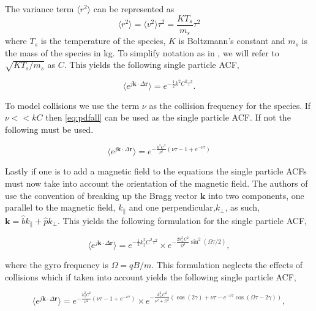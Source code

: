 \noindent The variance term $\langle r^2 \rangle$ can be represented as
\begin{equation}
\label{eq:var}
\langle r^2 \rangle = \langle v^2 \rangle \tau^2 = \frac{KT_s}{m_s} \tau^2
\end{equation}
 \noindent where $T_s$ is the temperature of the species, $K$ is Boltzmann's constant and $m_s$ is the mass of the species in kg. To simplify notation as in \citet{kudeki:milla:1}, we will refer to $\sqrt{KT_s/m_s}$ as $C$. This yields the following single particle ACF,
 
 \begin{equation}
\label{eq:pdfall}
\langle e^{j\mathbf{k}\cdot\Delta \mathbf{r}}\rangle= e^{-\frac{1}{2}k^2C^2 \tau^2}.
\end{equation}
 
 To model collisions we use the term $\nu$ as the collision frequency for the species. If $\nu<<kC$ then \ref{eq:pdfall} can be used as the single particle ACF. If not the following must be used.
 
 \begin{equation}
 \label{eq:colspacf}
 \langle e^{j\mathbf{k}\cdot\Delta \mathbf{r}}\rangle = e^{-\frac{k^2C^2}{\nu^2}\left( \nu \tau-1+e^{-\nu\tau}\right)}
 \end{equation}
 
Lastly if one is to add a magnetic field to the equations the single particle ACFs must now take into account the orientation of the magnetic field. The authors of \citet{kudeki:milla:1} use the convention of breaking up the Bragg vector $\mathbf{k}$ into two components, one parallel to the magnetic field, $k_{\parallel}$ and one perpendicular,$k_{\perp}$, as such, $\mathbf{k}= \hat{b}k_{\parallel}+\hat{p}k_{\perp}$. This yields the following formulation for the single particle ACF,

 \begin{equation}
\label{eq:pdfmag}
\langle e^{j\mathbf{k}\cdot\Delta \mathbf{r}}\rangle= e^{-\frac{1}{2}k_{\parallel}^2C^2 \tau^2}\times e^{-\frac{2k_{\perp}^2C^2}{\Omega^2} \sin^2(\Omega\tau/2)},
\end{equation}

\noindent where the gyro frequency is $\Omega = qB/m$. This formulation neglects the effects of collisions which if taken into account yields the following single particle ACF,

\begin{equation}
\label{eq:colspacf}
\langle e^{j\mathbf{k}\cdot\Delta \mathbf{r}}\rangle = e^{-\frac{k_\parallel^2C^2}{\nu^2}\left( \nu \tau-1+e^{-\nu\tau}\right)}\times e^{-\frac{k_\perp^2C^2}{\nu^2+\Omega^2}\left(\cos(2\gamma) + \nu \tau-e^{-\nu\tau}\cos(\Omega\tau-2\gamma)\right)},
\end{equation}
 
